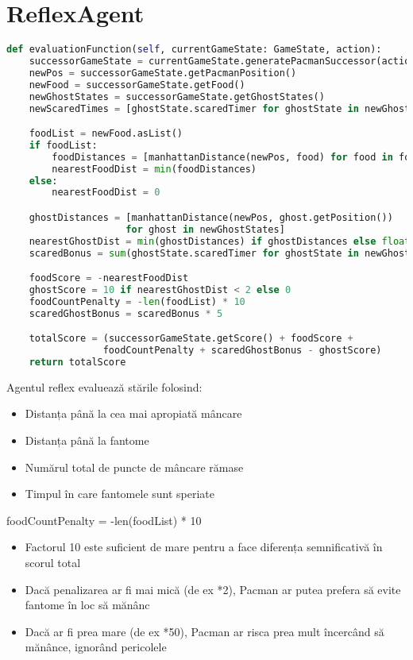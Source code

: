 \documentclass[12pt,a4paper]{article}
\begin{document}
\section {ReflexAgent}
\begin{lstlisting}[language=Python]
def evaluationFunction(self, currentGameState: GameState, action):
    successorGameState = currentGameState.generatePacmanSuccessor(action)
    newPos = successorGameState.getPacmanPosition()
    newFood = successorGameState.getFood()
    newGhostStates = successorGameState.getGhostStates()
    newScaredTimes = [ghostState.scaredTimer for ghostState in newGhostStates]

    foodList = newFood.asList()
    if foodList:
        foodDistances = [manhattanDistance(newPos, food) for food in foodList]
        nearestFoodDist = min(foodDistances)
    else:
        nearestFoodDist = 0

    ghostDistances = [manhattanDistance(newPos, ghost.getPosition()) 
                     for ghost in newGhostStates]
    nearestGhostDist = min(ghostDistances) if ghostDistances else float('inf')
    scaredBonus = sum(ghostState.scaredTimer for ghostState in newGhostStates)

    foodScore = -nearestFoodDist
    ghostScore = 10 if nearestGhostDist < 2 else 0
    foodCountPenalty = -len(foodList) * 10
    scaredGhostBonus = scaredBonus * 5

    totalScore = (successorGameState.getScore() + foodScore + 
                 foodCountPenalty + scaredGhostBonus - ghostScore)
    return totalScore
\end{lstlisting}

Agentul reflex evaluează stările folosind:
\begin{itemize}
    \item Distanța până la cea mai apropiată mâncare
    \item Distanța până la fantome
    \item Numărul total de puncte de mâncare rămase
    \item Timpul în care fantomele sunt speriate \newline
\end{itemize}

foodCountPenalty = -len(foodList) * 10
\begin{itemize}
    \item Factorul 10 este suficient de mare pentru a face diferența semnificativă în scorul total 
    \item Dacă penalizarea ar fi mai mică (de ex *2), Pacman ar putea prefera să evite fantome în loc să mănânc
    \item Dacă ar fi prea mare (de ex *50), Pacman ar risca prea mult încercând să mănânce, ignorând pericolele \newline
\end{itemize}
\end{document}
